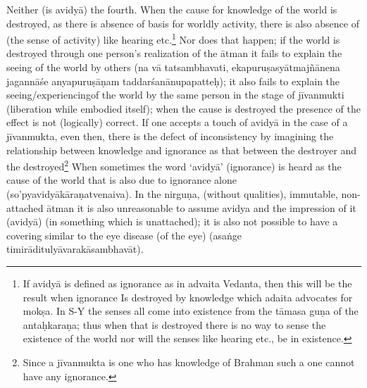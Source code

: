 Neither (is avidyā) the fourth. When the cause for knowledge of the world is destroyed, as there is absence of basis for worldly activity, there is also absence of (the sense of activity) like hearing etc.\footnote{If avidyā is defined as ignorance as in advaita Vedanta, then this will be the result when ignorance Is destroyed by knowledge which adaita advocates for mokṣa. In S-Y the senses all come into existence from the tāmasa guṇa of the antaḥkaraṇa; thus when that is destroyed there is no way to sense the existence of the world nor will the senses like hearing etc., be in existence.} Nor does that happen; if the world is destroyed through one person’s realization of the ātman it fails to explain the seeing of the world by others (na vā tatsambhavati, ekapuruṣasyātmajñānena jagannāśe anyapuruṣāṇam taddarśanānupapatteḥ); it also fails to explain the seeing/experiencingof the world by the same person in the stage of jīvanmukti (liberation while embodied itself); when the cause is destroyed the presence of the effect is not (logically) correct. If one accepts a touch of avidyā in the case of a jīvanmukta, even then, there is the defect of inconsistency by imagining the relationship between knowledge and ignorance as that between the destroyer and the destroyed\footnote{Since a jīvanmukta is one who has knowledge of Brahman such a one cannot have any ignorance.} When sometimes the word ‘avidyā’ (ignorance) is heard as the cause of the world that is also due to ignorance alone (so’pyavidyākāraṇatvenaiva). In the nirguṇa, (without qualities), immutable, non-attached ātman it is also unreasonable to assume avidya and the impression of it (avidyā) (in something which is unattached); it is also not possible to have a covering similar to the eye disease (of the eye) (asaṅge timirāditulyāvarakāsambhavāt). 

